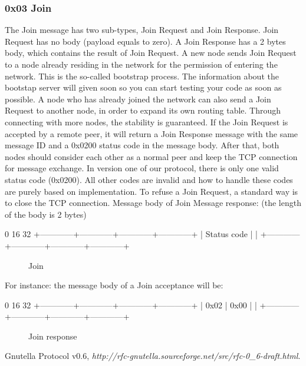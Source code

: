 \documentclass[12pt, a4paper]{article}
\begin{document}
\subsubsection{0x03 Join}
The Join message has two sub-types, Join Request and Join Response. Join Request has no body (payload equals to zero). A Join Response has a 2 bytes body, which contains the result of Join Request.
A new node sends Join Request to a node already residing in the network for the permission of entering the network. This is the so-called bootstrap process. The information about the bootstap server will given soon so you can start testing your code as soon as possible.
A node who has already joined the network can also send a Join Request to another node, in order to expand its own routing table. Through connecting with more nodes, the stability is guaranteed.
If the Join Request is accepted by a remote peer, it will return a Join Response message with the same message ID and a 0x0200 status code in the message body. After that, both nodes should consider each other as a normal peer and keep the TCP connection for message exchange.
In version one of our protocol, there is only one valid status code (0x0200). All other codes are invalid and how to handle these codes are purely based on implementation. To refuse a Join Request, a standard way is to close the TCP connection.
Message body of Join Message response: (the length of the body is 2 bytes)
\begin{verbbox}
0                          16                        32
+------------+------------+------------+------------+
|      Status code        |                         |
+------------+------------+------------+------------+
\end{verbbox}

\begin{figure}[h!]
  \centering
  \theverbbox
  \label{joinrequest}
  \caption{Join }
\end{figure}
For instance: the message body of a Join acceptance will be:
\begin{verbbox}
0                          16                        32
+------------+------------+------------+------------+
|    0x02    |    0x00    |                         |
+------------+------------+------------+------------+
\end{verbbox}

\begin{figure}[h!]
  \centering
  \theverbbox
  \label{header}
  \caption{Join response}
\end{figure}

\begin{thebibliography}{1}

Gnutella Protocol v0.6, \emph{http://rfc-gnutella.sourceforge.net/src/rfc-0\_6-draft.html}.

\end{thebibliography}
\end{document}
